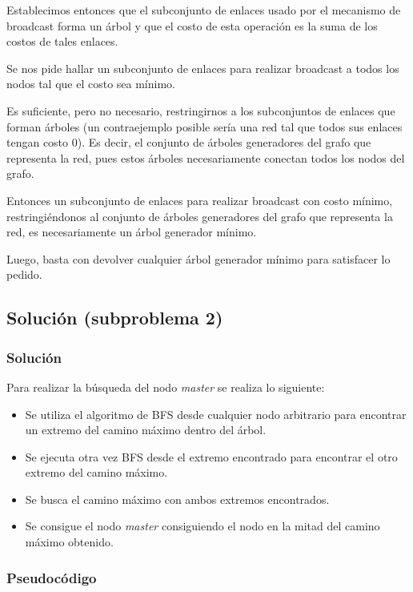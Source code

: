 \documentclass[a4paper, 10pt, twoside]{article}
\begin{document}
Establecimos entonces que el subconjunto de enlaces usado por el mecanismo de broadcast forma un árbol y que el costo de esta operación es la suma de los costos de tales enlaces. 

Se nos pide hallar un subconjunto de enlaces para realizar broadcast a todos los nodos tal que el costo sea mínimo.

Es suficiente, pero no necesario, restringirnos a los subconjuntos de enlaces que forman árboles (un contraejemplo posible sería una red tal que todos sus enlaces tengan costo 0). Es decir, el conjunto de árboles generadores del grafo que representa la red, pues estos árboles necesariamente conectan todos los nodos del grafo.

Entonces un subconjunto de enlaces para realizar broadcast con costo mínimo, restringiéndonos al conjunto de árboles generadores del grafo que representa la red, es necesariamente un árbol generador mínimo.

Luego, basta con devolver cualquier árbol generador mínimo para satisfacer lo pedido.


\subsection{Solución (subproblema 2)}

\subsubsection{Solución}

Para realizar la búsqueda del nodo \textit{master} se realiza lo siguiente:

\begin{itemize}
\item Se utiliza el algoritmo de BFS desde cualquier nodo arbitrario para encontrar un extremo del camino máximo dentro del árbol.
\item Se ejecuta otra vez BFS desde el extremo encontrado para encontrar el otro extremo del camino máximo.
\item Se busca el camino máximo con ambos extremos encontrados.
\item Se consigue el nodo \textit{master} consiguiendo el nodo en la mitad del camino máximo obtenido.
\end{itemize}

\subsubsection{Pseudocódigo}
\end{document}
